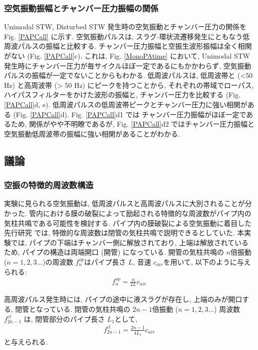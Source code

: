 \documentclass[12pt]{article}
\begin{document}
\subsubsection{空気振動振幅とチャンバー圧力振幅の関係}\label{AcoChp}
 Unimodal STW, Disturbed STW 発生時の空気振動とチャンバー圧力の関係を Fig. \ref{PAPCall} に示す. 空気振動パルスは, スラグ-環状流遷移発生にともなう低周波パルスの振幅と比較する. チャンバー圧力振幅と空振生波形振幅は全く相関がない (Fig. \ref{PAPCall}c). これは, Fig. \ref{MonoPAtime} において, Unimodal STW 発生時にチャンバー圧力が毎サイクルほぼ一定であるにもかかわらず, 空気振動パルスの振幅が一定でないことからもわかる. 低周波パルスは, 低周波帯と (<50 Hz) と高周波帯 (> 50 Hz) にピークを持つことから, それぞれの帯域でローパス, ハイパスフィルターをかけた波形の振幅と, チャンバー圧力を比較する (Fig. \ref{PAPCall}d, e). 低周波パルスの低周波帯ピークとチャンバー圧力に強い相関がある (Fig. \ref{PAPCall}d). Fig. \ref{PAPCall}d1 では チャンバー圧力振幅がほぼ一定であるため, 関係がやや不明瞭であるが, Fig. \ref{PAPCall}d2 ではチャンバー圧力振幅と空気振動低周波帯の振幅に強い相関があることがわかる.

\clearpage
\subsection{議論}\label{ACOdisc}


\subsubsection{空振の特徴的周波数構造}
実験に見られる空気振動は, 低周波パルスと高周波パルスに大別されることが分かった. 管内における膜の破裂によって励起される特徴的な周波数がパイプ内の気柱共鳴である可能性を検討する. パイプ内の膜破裂による空気振動に着目した先行研究 \citep{Vidal2006a, Sanchez2014} では, 特徴的な周波数は閉管の気柱共鳴で説明できるとしていた. 本実験では, パイプの下端はチャンバー側に解放されており, 上端は解放されているため, パイプの構造は両端開口 (開管) になっている. 開管の気柱共鳴の $n$倍振動 ($n=1,2,3...$)の周波数 $f^{op}_{n}$はパイプ長さ $L$, 音速 $c_{air}$を用いて, 以下のように与えられる:
\begin{eqnarray}
f^{op}_{n}=\frac{n}{2L} c_{air}
\end{eqnarray}

高周波パルス発生時には, パイプの途中に液スラグが存在し, 上端のみが開口する, 閉管となっている. 閉管の気柱共鳴の $2n-1$倍振動 ($n=1,2,3...$) 周波数 $f^{cl}_{2n-1}$ は, 閉管部分のパイプ長さ $L_1$として, 
\begin{eqnarray}
f^{cl}_{2n-1}=\frac{2n-1}{4L_1} c_{air}
\end{eqnarray}
と与えられる.
\end{document}
